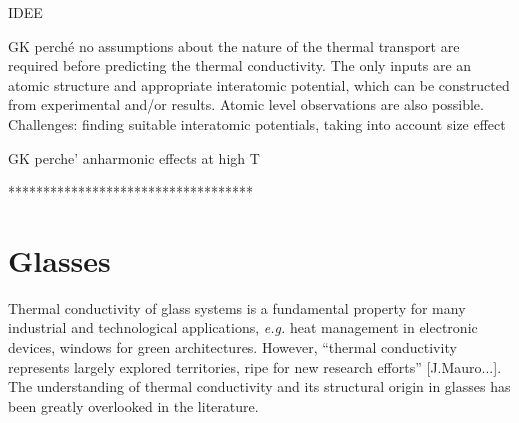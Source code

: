 
IDEE

GK perché no assumptions about the nature of the thermal transport are required before predicting the thermal conductivity. 
The only inputs are an atomic structure and appropriate interatomic potential, which can be constructed from experimental and/or \abinitio results. Atomic level observations are also possible. 
Challenges: finding suitable interatomic potentials, taking into account size effect

GK perche' anharmonic effects at high T


***********************************

\section{Glasses}
Thermal conductivity of glass systems is a fundamental property for many industrial and technological applications, \emph{e.g.} heat management in electronic devices, windows for green architectures.
However, ``thermal conductivity represents largely explored territories, ripe for new research efforts'' [J.Mauro...]\cite{MauroFM14,Mauro2014}. The understanding of thermal conductivity and its structural origin in glasses has been greatly overlooked in the literature. 

